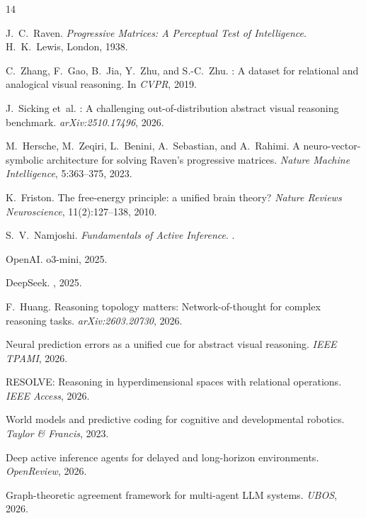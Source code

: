 \documentclass{article}
\begin{document}
\begin{thebibliography}{14}

J.~C.~Raven.
\newblock \emph{Progressive Matrices: A Perceptual Test of Intelligence}.
\newblock H.~K.~Lewis, London, 1938.

C.~Zhang, F.~Gao, B.~Jia, Y.~Zhu, and S.-C.~Zhu.
: A dataset for relational and analogical visual reasoning.
\newblock In \emph{CVPR}, 2019.

J.~Sicking et~al.
: A challenging out-of-distribution abstract visual reasoning benchmark.
\newblock \emph{arXiv:2510.17496}, 2026.

M.~Hersche, M.~Zeqiri, L.~Benini, A.~Sebastian, and A.~Rahimi.
\newblock A neuro-vector-symbolic architecture for solving {Raven's} progressive matrices.
\newblock \emph{Nature Machine Intelligence}, 5:363--375, 2023.

K.~Friston.
\newblock The free-energy principle: a unified brain theory?
\newblock \emph{Nature Reviews Neuroscience}, 11(2):127--138, 2010.

S.~V.~Namjoshi.
\newblock \emph{Fundamentals of Active Inference}.
.

{OpenAI}.
\newblock o3-mini, 2025.

{DeepSeek}.
, 2025.

F.~Huang.
\newblock Reasoning topology matters: Network-of-thought for complex reasoning tasks.
\newblock \emph{arXiv:2603.20730}, 2026.

Neural prediction errors as a unified cue for abstract visual reasoning.
\newblock \emph{IEEE TPAMI}, 2026.

{RESOLVE}: Reasoning in hyperdimensional spaces with relational operations.
\newblock \emph{IEEE Access}, 2026.

World models and predictive coding for cognitive and developmental robotics.
\newblock \emph{Taylor \& Francis}, 2023.

Deep active inference agents for delayed and long-horizon environments.
\newblock \emph{OpenReview}, 2026.

Graph-theoretic agreement framework for multi-agent LLM systems.
\newblock \emph{UBOS}, 2026.

\end{thebibliography}
\end{document}
